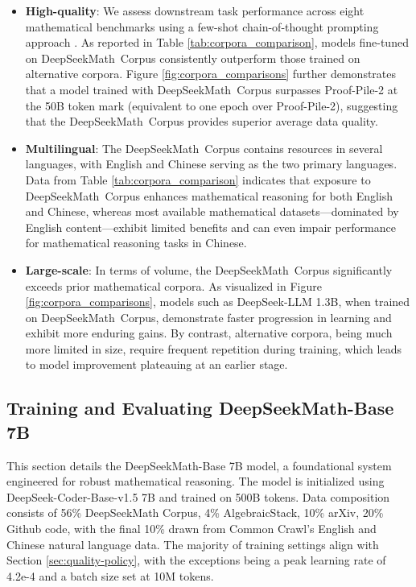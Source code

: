 \begin{itemize}[topsep=0pt]
    \item \textbf{High-quality}:
    We assess downstream task performance across eight mathematical benchmarks using a few-shot chain-of-thought prompting approach \cite{cot}. As reported in Table \ref{tab:corpora_comparison}, models fine-tuned on DeepSeekMath~Corpus consistently outperform those trained on alternative corpora. Figure \ref{fig:corpora_comparisons} further demonstrates that a model trained with DeepSeekMath~Corpus surpasses Proof-Pile-2 at the 50B token mark (equivalent to one epoch over Proof-Pile-2), suggesting that the DeepSeekMath~Corpus provides superior average data quality.
    \item \textbf{Multilingual}:
    The DeepSeekMath~Corpus contains resources in several languages, with English and Chinese serving as the two primary languages. Data from Table \ref{tab:corpora_comparison} indicates that exposure to DeepSeekMath~Corpus enhances mathematical reasoning for both English and Chinese, whereas most available mathematical datasets—dominated by English content—exhibit limited benefits and can even impair performance for mathematical reasoning tasks in Chinese.
    \item \textbf{Large-scale}:
    In terms of volume, the DeepSeekMath~Corpus significantly exceeds prior mathematical corpora. As visualized in Figure \ref{fig:corpora_comparisons}, models such as DeepSeek-LLM 1.3B, when trained on DeepSeekMath~Corpus, demonstrate faster progression in learning and exhibit more enduring gains. By contrast, alternative corpora, being much more limited in size, require frequent repetition during training, which leads to model improvement plateauing at an earlier stage.
\end{itemize}

\subsection{Training and Evaluating DeepSeekMath-Base 7B}

This section details the DeepSeekMath-Base 7B model, a foundational system engineered for robust mathematical reasoning. The model is initialized using DeepSeek-Coder-Base-v1.5 7B \citep{deepseek-coder} and trained on 500B tokens. Data composition consists of 56\% DeepSeekMath Corpus, 4\% AlgebraicStack, 10\% arXiv, 20\% Github code, with the final 10\% drawn from Common Crawl’s English and Chinese natural language data. The majority of training settings align with Section \ref{sec:quality-policy}, with the exceptions being a peak learning rate of 4.2e-4 and a batch size set at 10M tokens.

